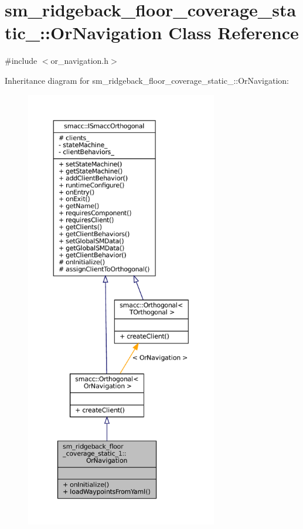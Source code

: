 \hypertarget{classsm__ridgeback__floor__coverage__static__1_1_1OrNavigation}{}\section{sm\+\_\+ridgeback\+\_\+floor\+\_\+coverage\+\_\+static\+\_\+:\+:Or\+Navigation Class Reference}
\label{classsm__ridgeback__floor__coverage__static__1_1_1OrNavigation}


{\ttfamily \#include $<$or\+\_\+navigation.\+h$>$}



Inheritance diagram for sm\+\_\+ridgeback\+\_\+floor\+\_\+coverage\+\_\+static\+\_\+:\+:Or\+Navigation\+:
\nopagebreak
\begin{figure}[H]
\begin{center}
\leavevmode
\includegraphics[height=550pt]{classsm__ridgeback__floor__coverage__static__1_1_1OrNavigation__inherit__graph}
\end{center}
\end{figure}


